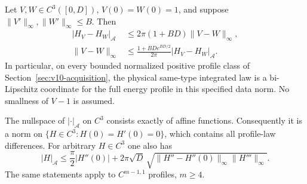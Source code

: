 \begin{theorem}
\label{thm:v11-abel-inverse}
Let $V,W\in C^3([0,D])$, $V(0)=W(0)=1$, and suppose
$\|V'\|_\infty,\|W'\|_\infty\le B$. Then
\begin{equation}\label{eq:v11-two-sided}
 \begin{split}
 |H_V-H_W|_{\mathscr A}
       &\le 2\pi(1+BD)\|V-W\|_\infty,\\
 \|V-W\|_\infty
       &\le \frac{1+BD e^{BD/2}}{2\pi}
                                |H_V-H_W|_{\mathscr A}.
 \end{split}
\end{equation}
In particular, on every bounded normalized positive profile class of
Section~\ref{sec:v10-acquisition}, the physical same-type integrated
law is a bi-Lipschitz coordinate for the full energy profile in this
specified data norm. No smallness of $V-1$ is assumed.

The nullspace of $|\cdot|_{\mathscr A}$ on $C^3$ consists exactly of
affine functions. Consequently it is a norm on
$\{H\in C^3:H(0)=H'(0)=0\}$, which contains all profile-law
differences. For arbitrary $H\in C^3$ one also has
\begin{equation}\label{eq:v11-mixed-bound}
 |H|_{\mathscr A}\le\frac\pi2|H''(0)|
   +2\pi\sqrt D\,
       \sqrt{\|H''-H''(0)\|_\infty\|H'''\|_\infty}.
\end{equation}
The same statements apply to $C^{m-1,1}$ profiles, $m\ge4$.
\end{theorem}
